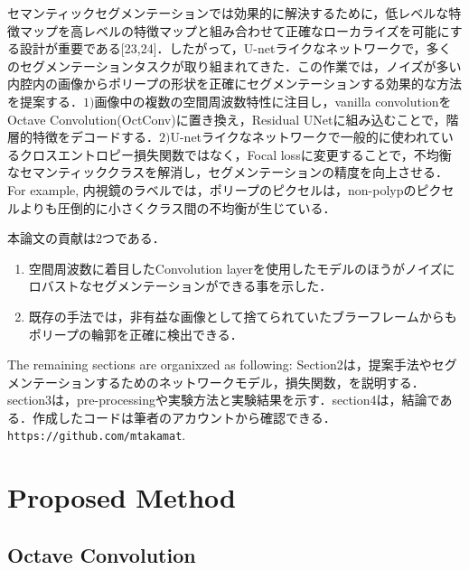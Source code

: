 \documentclass{article}
\begin{document}
セマンティックセグメンテーションでは効果的に解決するために，低レベルな特徴マップを高レベルの特徴マップと組み合わせて正確なローカライズを可能にする設計が重要である[23,24]．したがって，U-netライクなネットワークで，多くのセグメンテーションタスクが取り組まれてきた．この作業では，ノイズが多い内腔内の画像からポリープの形状を正確にセグメンテーションする効果的な方法を提案する．\(1)\)画像中の複数の空間周波数特性に注目し，vanilla convolutionをOctave Convolution(OctConv)に置き換え，Residual UNetに組み込むことで，階層的特徴をデコードする．\(2)\)U-netライクなネットワークで一般的に使われているクロスエントロピー損失関数ではなく，Focal lossに変更することで，不均衡なセマンティッククラスを解消し，セグメンテーションの精度を向上させる．For example, 内視鏡のラベルでは，ポリープのピクセルは，non-polypのピクセルよりも圧倒的に小さくクラス間の不均衡が生じている．

本論文の貢献は2つである．
\begin{enumerate}[(1)]
\item 空間周波数に着目したConvolution layerを使用したモデルのほうがノイズにロバストなセグメンテーションができる事を示した．
\item 既存の手法では，非有益な画像として捨てられていたブラーフレームからもポリープの輪郭を正確に検出できる．
\end{enumerate}

The remaining sections are organixzed as following: Section2は，提案手法やセグメンテーションするためのネットワークモデル，損失関数，を説明する．section3は，pre-processingや実験方法と実験結果を示す．section4は，結論である．作成したコードは筆者のアカウントから確認できる．\texttt{https://github.com/mtakamat}.

\section{Proposed Method}
\label{sec:pro}
\subsection{Octave Convolution}
\end{document}
